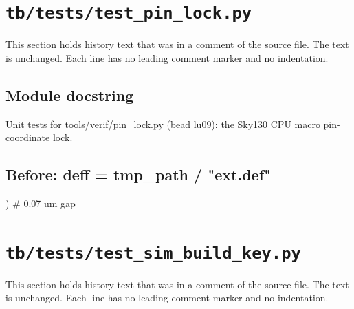 \section{\texttt{tb/tests/test\_pin\_lock.py}}\label{cr:suite:test-pin-lock}

This section holds history text that was in a comment of the source file. The text is unchanged. Each line has no leading comment marker and no indentation.

\begin{record}

\subsection*{Module docstring}

\begin{textblock}
Unit tests for tools/verif/pin_lock.py (bead lu09): the Sky130 CPU macro pin-coordinate lock.
\end{textblock}

\subsection*{Before: deff = tmp\_path / "ext.def"}

\begin{textblock}
)  # 0.07 um gap
\end{textblock}

\end{record}

\section{\texttt{tb/tests/test\_sim\_build\_key.py}}\label{cr:suite:test-sim-build-key}

This section holds history text that was in a comment of the source file. The text is unchanged. Each line has no leading comment marker and no indentation.

